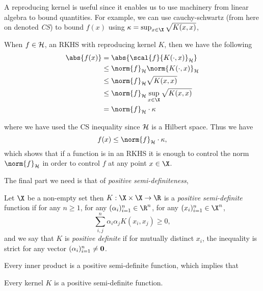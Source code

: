 A reproducing kernel is useful since it enables us to use machinery from linear
algebra to bound quantities. For example, we can use cauchy-schwartz (from here
on denoted \emph{CS}) to bound \(f(x)\) using \(\kappa = \sup_{x \in \X}
\sqrt{K(x, x)}\),
\begin{example}
\label{ex:cs-rkhs-bound-on-fx} When \(f \in \mathcal{H}\), an RKHS with reproducing
kernel \(K\), then we have the following
  \begin{align*} \abs{f(x)} & = \abs{\scal{f}{K(\cdot, x)}_{\rkhs{H}}} \\ & \leq
\norm{f}_{\rkhs{H}} \norm{K(\cdot, x)}_{\rkhs{H}} \\ & \leq \norm{f}_{\rkhs{H}}
\sqrt{K(x, x)} \\ & \leq \norm{f}_{\rkhs{H}} \sup_{x \in \X} \sqrt{K(x, x)} \\ &
= \norm{f}_{\rkhs{H}} \cdot \kappa
  \end{align*}
\end{example} where we have used the CS inequality since \(\mathcal{H}\) is a
Hilbert space. Thus we have
\begin{equation*}
\label{eq:cs-rkhs-bound-on-fx} f(x) \leq \norm{f}_{\rkhs{H}} \cdot \kappa,
\end{equation*} which shows that if a function is in an RKHS it is enough to
control the norm \(\norm{f}_{\rkhs{H}}\) in order to control \(f\) at any point
\(x \in \X\).

The final part we need is that of \emph{positive semi-definiteness},
\begin{definition}
  \label{def:pos-semi-definite-function} Let \(\X\) be a non-empty set then \(K
: \X \times \X \to \R\) is a \textit{positive semi-definite} function if for any
\(n \geq 1\), for any \((\alpha_i)_{i=1}^n \in \R^n\), for any \((x_i)_{i=1}^n
\in \X^n\),
\begin{equation*} \sum_{i, j}^n \alpha_i \alpha_j K(x_i, x_j) \geq 0,
\end{equation*} and we say that \(K\) is \textit{positive definite} if for
mutually distinct \(x_i\), the inequality is strict for any vector
\((\alpha_i)_{i=1}^n \neq \mathbf{0}\).
\end{definition}

Every inner product is a positive semi-definite function, which implies that
\begin{corollary}
\label{cor:kernels-are-positive-semi-definite} Every kernel \(K\) is a positive
semi-definite function.
\end{corollary}


